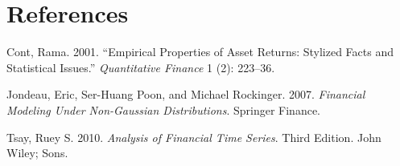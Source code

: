 \documentclass[11pt,]{article}
\begin{document}
\section*{References}\label{references}

\hypertarget{refs}{}
\hypertarget{ref-Cont:2001}{}
Cont, Rama. 2001. ``Empirical Properties of Asset Returns: Stylized
Facts and Statistical Issues.'' \emph{Quantitative Finance} 1 (2):
223--36.

\hypertarget{ref-Jondeau_Poon_Rockinger:2007}{}
Jondeau, Eric, Ser-Huang Poon, and Michael Rockinger. 2007.
\emph{Financial Modeling Under Non-Gaussian Distributions}. Springer
Finance.

\hypertarget{ref-Tsay:2010}{}
Tsay, Ruey S. 2010. \emph{Analysis of Financial Time Series}. Third
Edition. John Wiley; Sons.
\end{document}
